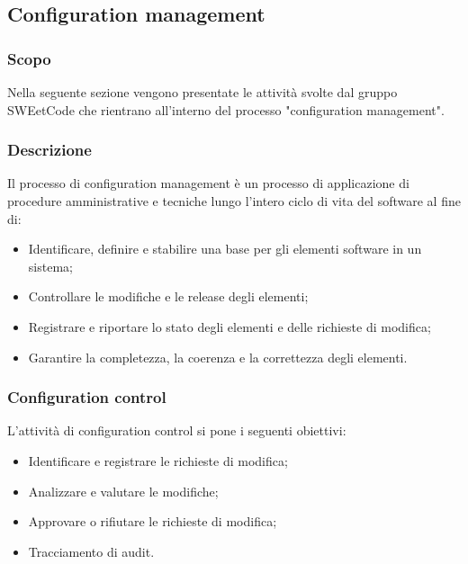 \documentclass[10pt, a4paper]{article}
\begin{document}
\subsection{Configuration management}
\label{sec:configuration_control}
\subsubsection{Scopo}
Nella seguente sezione vengono presentate le attività svolte dal gruppo SWEetCode che rientrano all'interno del processo "configuration management".

\subsubsection{Descrizione}
Il processo di configuration management è un processo di applicazione di procedure amministrative e tecniche lungo l'intero ciclo di vita del software al fine di:
\begin{itemize}
    \item Identificare, definire e stabilire una base per gli elementi software in un sistema;
    \item Controllare le modifiche e le release degli elementi;
    \item Registrare e riportare lo stato degli elementi e delle richieste di modifica;
    \item Garantire la completezza, la coerenza e la correttezza degli elementi.
\end{itemize}

\subsubsection{Configuration control}
L'attività di configuration control si pone i seguenti obiettivi:
\begin{itemize}
    \item Identificare e registrare le richieste di modifica;
    \item Analizzare e valutare le modifiche;
    \item Approvare o rifiutare le richieste di modifica;
    \item Tracciamento di audit.
\end{itemize}
\end{document}
